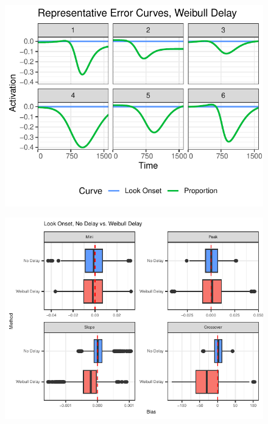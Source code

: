 \documentclass{beamer}
\begin{document}
\begin{frame}
\begin{figure}[H]
\centering
\includegraphics{error_weibull_delay.pdf}
\end{figure}
\end{frame}



\begin{frame}
\begin{figure}[H]
\centering
\includegraphics{compare_bar_plot2.pdf}
\end{figure}
\end{frame}
\end{document}
